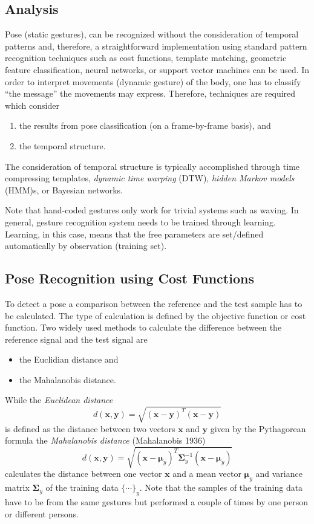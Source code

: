 \documentclass[titlepage,12pt,a4paper]{article}
\begin{document}
\subsection{Analysis}

Pose (static gestures), can be recognized without the consideration of temporal patterns and, therefore, a straightforward implementation using standard pattern recognition techniques such as cost functions, template matching, geometric feature classification, neural networks, or support vector machines can be used. In order to interpret movements (dynamic gesture) of the body, one has to classify “the message” the movements may express. Therefore, techniques are required which consider 
\begin{enumerate}
	\item the results from pose classification (on a frame-by-frame basis), and
	\item the temporal structure.
\end{enumerate}
The consideration of temporal structure is typically accomplished through time compressing templates, \emph{dynamic time warping} (DTW), \emph{hidden Markov models} (HMM)s, or Bayesian networks.

Note that hand-coded gestures only work for trivial systems such as waving. In general, gesture recognition system needs to be trained through learning. Learning, in this case, means that the free parameters are set/defined automatically by observation (training set).

\subsection{Pose Recognition using Cost Functions}
To detect a pose a comparison between the reference and the test sample has to be calculated. The type of calculation is defined by the objective function or cost function. Two widely used methods to calculate the difference between the reference signal and the test signal are 
\begin{itemize}
	\item the Euclidian distance and 
	\item the Mahalanobis distance.
\end{itemize}

While the \emph{Euclidean distance}
\[
	d(\mathbf{x},\mathbf{y}) = \sqrt{(\mathbf{x}-\mathbf{y})^T(\mathbf{x}-\mathbf{y})}
\]
is defined as the distance between two vectors $\mathbf{x}$ and $\mathbf{y}$ given by the Pythagorean formula the 
\emph{Mahalanobis distance} (Mahalanobis 1936)
\[
	d(\mathbf{x},\mathbf{y}) = \sqrt{(\mathbf{x}-\mathbf{\mu}_y)^T\mathbf{\Sigma}_y^{-1}(\mathbf{x}-\mathbf{\mu}_y)}
\]
calculates the distance between one vector $\mathbf{x}$ and a mean vector $\mathbf{\mu}_y$ and variance matrix $\mathbf{\Sigma}_y$  of the training data $\{\cdots\}_y$. Note that the samples of the training data have to be from the same gestures but performed a couple of times by one person or different persons.  
\end{document}
